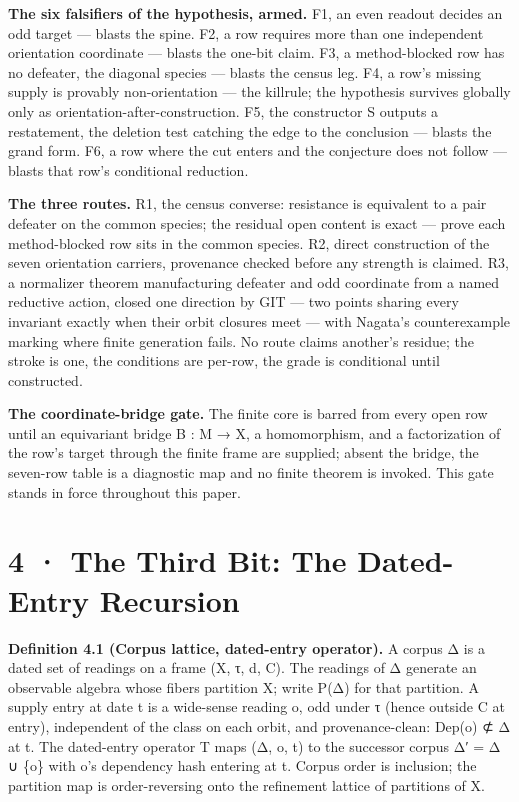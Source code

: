 \documentclass[10pt,twocolumn]{article}
\begin{document}
\textbf{The six falsifiers of the hypothesis, armed.} F1, an even
readout decides an odd target --- blasts the spine. F2, a row requires
more than one independent orientation coordinate --- blasts the one-bit
claim. F3, a method-blocked row has no defeater, the diagonal species
--- blasts the census leg. F4, a row's missing supply is provably
non-orientation --- the killrule; the hypothesis survives globally only
as orientation-after-construction. F5, the constructor S outputs a
restatement, the deletion test catching the edge to the conclusion ---
blasts the grand form. F6, a row where the cut enters and the conjecture
does not follow --- blasts that row's conditional reduction.

\textbf{The three routes.} R1, the census converse: resistance is
equivalent to a pair defeater on the common species; the residual open
content is exact --- prove each method-blocked row sits in the common
species. R2, direct construction of the seven orientation carriers,
provenance checked before any strength is claimed. R3, a normalizer
theorem manufacturing defeater and odd coordinate from a named reductive
action, closed one direction by GIT --- two points sharing every
invariant exactly when their orbit closures meet --- with Nagata's
counterexample marking where finite generation fails. No route claims
another's residue; the stroke is one, the conditions are per-row, the
grade is conditional until constructed.

\textbf{The coordinate-bridge gate.} The finite core is barred from
every open row until an equivariant bridge B : M → X, a homomorphism,
and a factorization of the row's target through the finite frame are
supplied; absent the bridge, the seven-row table is a diagnostic map and
no finite theorem is invoked. This gate stands in force throughout this
paper.

\section{4 · The Third Bit: The Dated-Entry
Recursion}\label{the-third-bit-the-dated-entry-recursion}

\textbf{Definition 4.1 (Corpus lattice, dated-entry operator).} A corpus
Δ is a dated set of readings on a frame (X, τ, d, C). The readings of Δ
generate an observable algebra whose fibers partition X; write P(Δ) for
that partition. A supply entry at date t is a wide-sense reading o, odd
under τ (hence outside C at entry), independent of the class on each
orbit, and provenance-clean: Dep(o) ⊄ Δ at t. The dated-entry operator T
maps (Δ, o, t) to the successor corpus Δ′ = Δ ∪ \{o\} with o's
dependency hash entering at t. Corpus order is inclusion; the partition
map is order-reversing onto the refinement lattice of partitions of X.
\end{document}

